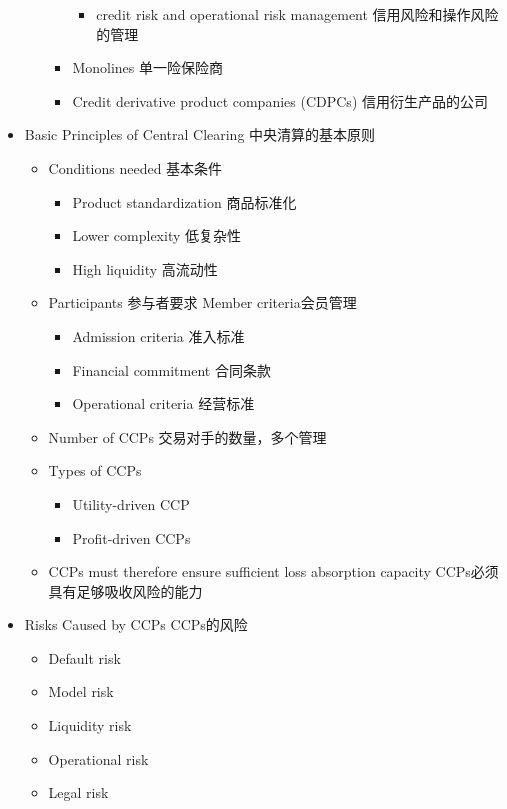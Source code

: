 \documentclass[a4paper,6pt,twoside,openany]{article}
\begin{document}
\begin{itemize}
\begin{itemize}
\begin{itemize}
\begin{itemize}
      \item credit risk and operational risk management 信用风险和操作风险的管理
      \end{itemize}
    \item Monolines 单一险保险商
    \item Credit derivative product companies (CDPCs) 信用衍生产品的公司
    \end{itemize}
  \end{itemize}
\item Basic Principles of Central Clearing 中央清算的基本原则
  \begin{itemize}
  \item Conditions needed 基本条件
    \begin{itemize}
    \item Product standardization 商品标准化
    \item Lower complexity 低复杂性
    \item High liquidity 高流动性
    \end{itemize}
  \item Participants 参与者要求 Member criteria会员管理
    \begin{itemize}
    \item Admission criteria 准入标准
    \item Financial commitment 合同条款
    \item Operational criteria 经营标准
    \end{itemize}
  \item Number of CCPs 交易对手的数量，多个管理
  \item Types of CCPs
    \begin{itemize}
    \item Utility-driven CCP
    \item Profit-driven CCPs
    \end{itemize}
    \item CCPs must therefore ensure sufficient loss absorption capacity CCPs必须具有足够吸收风险的能力
    \end{itemize}
  \item Risks Caused by CCPs CCPs的风险
    \begin{itemize}
    \item Default risk
    \item Model risk
    \item Liquidity risk
    \item Operational risk
    \item Legal risk
    \end{itemize}
\end{itemize}
\end{document}
